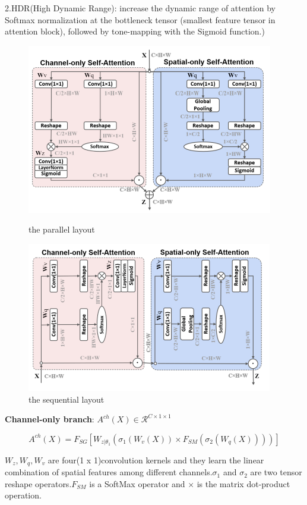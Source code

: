 \documentclass[11pt]{article}
\begin{document}
\noindent 2.HDR(High Dynamic Range): increase the dynamic range of attention by Softmax normalization at the bottleneck tensor (smallest feature tensor in attention block), followed by tone-mapping with the Sigmoid function.)
\begin{figure}[h]
	\centering
	\begin{minipage}{0.45\textwidth}
		\includegraphics[scale = 0.5]{19}
		\caption{the parallel layout}
	\end{minipage}
\quad
	\begin{minipage}{0.45\textwidth}
		\includegraphics[scale = 0.5]{20}
		\caption{the sequential layout}
	\end{minipage}
\end{figure}

\textbf{Channel-only branch}: $A^{ch}(X) \in \mathcal{R}^{C\times 1\times 1}$

$$A^{ch}(X)=F_{SG}[W_{z|\theta_1}(\sigma_1(W_v(X))\times F_{SM}(\sigma_2(W_q(X))))]$$

$W_z,W_q,W_v$ are four(1 x 1)convolution kernels and they learn the linear combination of spatial
features among different channels.$\sigma_1$ and $\sigma_2$ are two tensor reshape operators.$F_{SM}$ is a SoftMax operator and $\times$ is the matrix dot-product operation.
\end{document}
